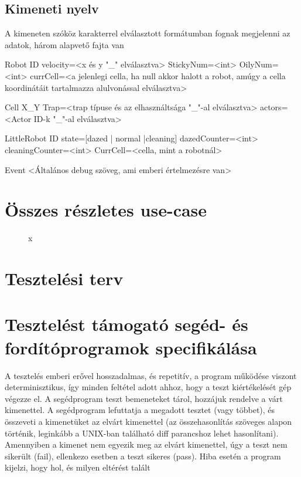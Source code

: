 \subsection{Kimeneti nyelv}
A kimeneten szóköz karakterrel elválasztott formátumban fognak megjelenni az adatok, három alapvető fajta van

Robot ID velocity=<x és y "\_" elválasztva> StickyNum=<int> OilyNum=<int> currCell=<a jelenlegi cella, ha null akkor halott a robot, amúgy a cella koordinátáit tartalmazza alulvonással elválasztva>

Cell X\_Y Trap=<trap típuse és az elhasználtsága "\_"-al elválasztva> actors=<Actor ID-k "\_"-al elválasztva>

LittleRobot ID state=[dazed | normal |cleaning] dazedCounter=<int> cleaningCounter=<int> CurrCell=<cella, mint a robotnál>

Event <Általános debug szöveg, ami emberi értelmezésre van>

\section{Összes részletes use-case}

\begin{figure}[h]
\begin{center}
\caption{x}
\label{fig:ProtoUseCase}
\end{center}
\end{figure}


\section{Tesztelési terv}






\section{Tesztelést támogató segéd- és fordítóprogramok specifikálása}
A tesztelés emberi erővel hosszadalmas, és repetitív, a program működése viszont determinisztikus, így minden
feltétel adott ahhoz, hogy a teszt kiértékelését gép végezze el. A segédprogram teszt bemeneteket tárol, hozzájuk rendelve
a várt kimenettel. A segédprogram lefuttatja a megadott tesztet (vagy többet), és összeveti a kimenetüket
az elvárt kimenettel (az összehasonlítás szöveges alapon történik, leginkább a UNIX-ban található diff parancshoz
lehet hasonlítani). Amennyiben a kimenet nem egyezik meg az elvárt kimenettel, úgy a teszt nem sikerült
(fail), ellenkezo esetben a teszt sikeres (pass). Hiba esetén a program kijelzi, hogy hol, és milyen eltérést talált

